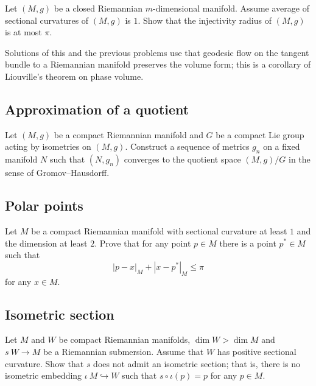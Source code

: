 \begin{pr} 
Let $(M,g)$ be a closed 
Riemannian $m$-dimensional manifold.
Assume average of sectional curvatures of $(M,g)$ is $1$. 
Show that the injectivity radius of $(M,g)$ is at most $\pi$.
\end{pr}

Solutions of this and the previous problems use that geodesic flow on the tangent bundle to a Riemannian manifold preserves the volume form; this is a corollary of Liouville's theorem on phase volume.

\subsection*{Approximation of a quotient}

\begin{pr}
Let $(M,g)$ be a compact Riemannian manifold 
and $G$ be a compact Lie group acting by isometries on $(M,g)$.
Construct a sequence of metrics $g_n$ on a fixed manifold $N$ such that $(N,g_n)$ converges to the quotient space $(M,g)/G$ in the sense of Gromov--Hausdorff.
\end{pr}


\subsection*{Polar points\many}
\label{milka-polar} 

\begin{pr}
Let $M$ be a compact Riemannian manifold with sectional curvature at least $1$ 
and the dimension at least $2$. 
Prove that for any point $p\in M$ there is a point $p^*\in M$ such that 
\[|p-x|_M+|x-p^*|_M\le \pi\]
for any $x\in M$.
\end{pr}

\subsection*{Isometric section\hard}
\label{Isometric section}

\begin{pr}
Let $M$ and $W$ be compact Riemannian manifolds,
$\dim W>\dim M$
and $s\:W\to M$ be a Riemannian submersion.
Assume that $W$ has positive sectional curvature.
Show that $s$ does not admit an isometric section;
that is, there is no isometric embedding $\iota\:M\hookrightarrow W$ such that $s\circ\iota(p)=p$ for any $p\in M$.
\end{pr}

